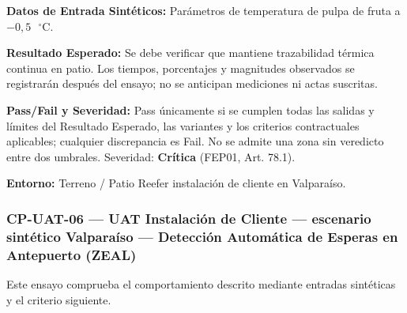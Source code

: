 \par\noindent\textbf{Datos de Entrada Sintéticos:} Parámetros de temperatura de pulpa de fruta a \(-0{,}5\text{ }^\circ\text{C}\).\par
\par\noindent\textbf{Resultado Esperado:} Se debe verificar que mantiene trazabilidad térmica continua en patio. Los tiempos, porcentajes y magnitudes observados se registrarán después del ensayo; no se anticipan mediciones ni actas suscritas.\par
\par\noindent\textbf{Pass/Fail y Severidad:} Pass únicamente si se cumplen todas las salidas y límites del Resultado Esperado, las variantes y los criterios contractuales aplicables; cualquier discrepancia es Fail. No se admite una zona sin veredicto entre dos umbrales. Severidad: \textbf{Crítica} (FEP01, Art. 78.1).\par
\par\noindent\textbf{Entorno:} Terreno / Patio Reefer instalación de cliente en Valparaíso.\par


\subsubsection*{CP-UAT-06 — UAT Instalación de Cliente — escenario sintético Valparaíso — Detección Automática de Esperas en Antepuerto (ZEAL)}\label{sec:9-cp-uat-06}
Este ensayo comprueba el comportamiento descrito mediante entradas sintéticas y el criterio siguiente.

